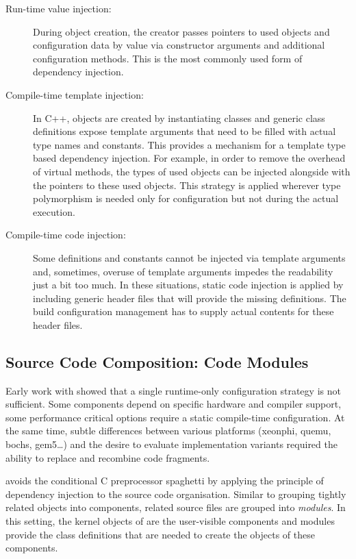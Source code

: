 \begin{description}
\item[Run-time value injection:]
During object creation, the creator passes pointers to used objects and configuration data by value via constructor arguments and additional configuration methods. This is the most commonly used form of dependency injection.

\item[Compile-time template injection:]
In C++, objects are created by instantiating classes and generic class definitions expose template arguments that need to be filled with actual type names and constants. This provides a mechanism for a template type based dependency injection. For example, in order to remove the overhead of virtual methods, the types of used objects can be injected alongside with the pointers to these used objects. This strategy is applied wherever type polymorphism is needed only for configuration but not during the actual execution. 

\item[Compile-time code injection:]
Some definitions and constants cannot be injected via template arguments and, sometimes, overuse of template arguments impedes the readability just a bit too much. In these situations, static code injection is applied by including generic header files that will provide the missing definitions. The build configuration management has to supply actual contents for these header files.
\end{description}


\subsection{Source Code Composition: Code Modules}
\label{sec:code-modules-impl}

Early work with \mythos showed that a single runtime-only configuration 
strategy is not sufficient. Some components
depend on specific hardware and compiler support, some performance
critical options require a static compile-time configuration.
At the same time, subtle differences between various platforms (xeonphi, quemu, bochs, gem5\ldots) and the desire to evaluate implementation variants required the ability to replace and recombine code fragments.

\mythos avoids the conditional C preprocessor spaghetti by applying
the principle of dependency injection to the source code organisation.
Similar to grouping tightly related objects into components, related source files are grouped into \emph{modules}.
In this setting, the kernel objects of \mythos are the user-visible components and modules provide the class definitions that are needed to create the objects of these components. 

